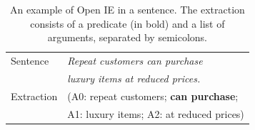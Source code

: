 \documentclass[letterpaper]{article} %
\begin{document}
\begin{table}[t!]
\begin{center}
\begin{tabular}{|l|l|}
\hline 
Sentence & \emph{Repeat customers can purchase} \\ 
& \emph{luxury items at reduced prices.}\\ 
\hline 
Extraction & (A0: repeat customers; \textbf{can purchase}; \\
&A1: luxury items; A2: at reduced prices)\\
\hline
\end{tabular}
\end{center}
\caption{An example of Open IE in a sentence. The extraction consists of a predicate (in bold) and a list of arguments, separated by semicolons.}
\label{simple_example}
\end{table}
\end{document}
